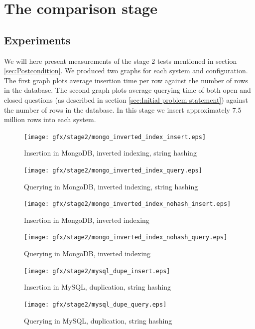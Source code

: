 \section{The comparison stage}

\subsection{Experiments}
We will here present measurements of the stage 2 tests mentioned in section \ref{sec:Postcondition}. We produced two graphs for each system and configuration. The first graph plots average insertion time per row against the number of rows in the database. The second graph plots average querying time of both open and closed questions (as described in section \ref{sec:Initial problem statement}) against the number of rows in the database. In this stage we insert approximately 7.5 million rows into each system.

\begin{figure}
    \centering
    \texttt{[image: gfx/stage2/mongo\_inverted\_index\_insert.eps]}
    \caption{Insertion in MongoDB, inverted indexing, string hashing}
    \label{fig:mongo_iii}
\end{figure}
\begin{figure} 
    \centering
    \texttt{[image: gfx/stage2/mongo\_inverted\_index\_query.eps]}
    \caption{Querying in MongoDB, inverted indexing, string hashing}
    \label{fig:mongo_iiq}
\end{figure}
\clearpage

\begin{figure} 
    \centering
    \texttt{[image: gfx/stage2/mongo\_inverted\_index\_nohash\_insert.eps]}
    \caption{Insertion in MongoDB, inverted indexing}
    \label{fig:mongo_iini}
\end{figure}
\begin{figure} 
    \centering
    \texttt{[image: gfx/stage2/mongo\_inverted\_index\_nohash\_query.eps]}
    \caption{Querying in MongoDB, inverted indexing}
    \label{fig:mongo_iinq}
\end{figure}
\clearpage

\begin{figure} 
    \centering
    \texttt{[image: gfx/stage2/mysql\_dupe\_insert.eps]}
    \caption{Insertion in MySQL, duplication, string hashing}
    \label{fig:mysql_di}
\end{figure}
\begin{figure} 
    \centering
    \texttt{[image: gfx/stage2/mysql\_dupe\_query.eps]}
    \caption{Querying in MySQL, duplication, string hashing}
    \label{fig:mysql_dq}
\end{figure}
\clearpage


